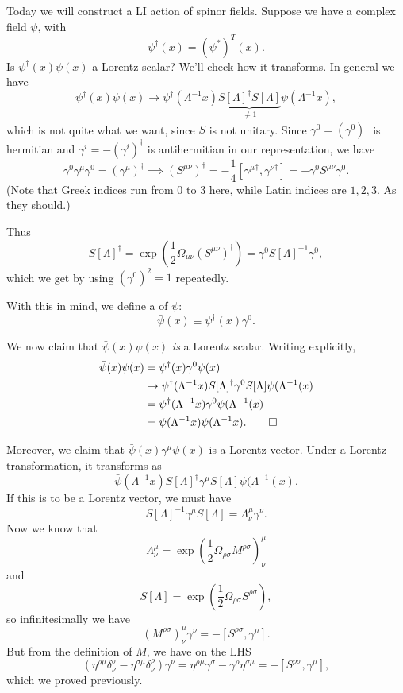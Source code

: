 Today we will construct a LI action of spinor fields. Suppose we have a complex field $\psi$, with
$$\psi^\dagger(x)=(\psi^*)^T(x).$$
Is $\psi^\dagger(x) \psi(x)$ a Lorentz scalar? We'll check how it transforms. In general we have
\begin{equation}
    \psi^\dagger(x)\psi(x) \to \psi^\dagger(\Lambda^{-1}x)\underbrace{S[\Lambda]^\dagger S[\Lambda]}_{\neq 1}\psi(\Lambda^{-1}x),
\end{equation}
which is not quite what we want, since $S$ is not unitary. Since $\gamma^0=(\gamma^0)^\dagger$ is hermitian and $\gamma^i=-(\gamma^i)^\dagger$ is antihermitian in our representation, we have
\begin{equation}
    \gamma^0 \gamma^\mu \gamma^0=(\gamma^\mu)^\dagger\implies (S^{\mu\nu})^\dagger =-\frac{1}{4}[{\gamma^\mu}^\dagger,{\gamma^\nu}^\dagger]=-\gamma^0 S^{\mu\nu}\gamma^0.
\end{equation}
(Note that Greek indices run from $0$ to $3$ here, while Latin indices are $1,2,3$. As they should.)

Thus
$$S[\Lambda]^\dagger=\exp(\frac{1}{2} \Omega_{\mu\nu}(S^{\mu\nu})^\dagger)=\gamma^0 S[\Lambda]^{-1}\gamma^0,$$
which we get by using $(\gamma^0)^2=1$ repeatedly. 
\begin{defn}
With this in mind, we define a  of $\psi$:
$$\bar\psi(x)\equiv \psi^\dagger(x) \gamma^0.$$
\end{defn}
We now claim that $\bar \psi(x)\psi(x)$ \emph{is} a Lorentz scalar. Writing explicitly,
\begin{align*}
    \bar \psi(x)\psi(x) &= \psi^\dagger(x) \gamma^0 \psi(x)\\
    &\to \psi^\dagger(\Lambda^{-1}x)S[\Lambda]^\dagger \gamma^0 S[\Lambda]\psi(\Lambda^{-1}(x)\\
    &=\psi^\dagger(\Lambda^{-1}x) \gamma^0 \psi(\Lambda^{-1}(x)\\
    &= \bar \psi(\Lambda^{-1}x)\psi(\Lambda^{-1}x). \qed
\end{align*}

Moreover, we claim that $\bar\psi(x)\gamma^\mu \psi(x)$ is a Lorentz vector. Under a Lorentz transformation, it transforms as
$$\bar\psi(\Lambda^{-1}x)S[\Lambda]^\dagger \gamma^\mu S[\Lambda]\psi(\Lambda^{-1}(x).$$
If this is to be a Lorentz vector, we must have
$$S[\Lambda]^{-1} \gamma^\mu S[\Lambda]=\Lambda^\mu_\nu \gamma^\nu.$$
Now we know that
$$\Lambda^\mu_\nu = \exp\left(\frac{1}{2}\Omega_{\rho\sigma}M^{\rho\sigma}\right)^\mu_\nu$$
and
$$S[\Lambda]=\exp\left(\frac{1}{2}\Omega_{\rho\sigma}S^{\rho\sigma}\right),$$
so infinitesimally we have
$$(M^{\rho\sigma})^\mu_\nu \gamma^\nu = -[S^{\rho\sigma},\gamma^\mu].$$ But from the definition of $M$, we have on the LHS
$$(\eta^{\rho\mu}\delta^\sigma_\nu-\eta^{\sigma\mu}\delta^\rho_\nu)\gamma^\nu =\eta^{\rho\mu}\gamma^\sigma - \gamma^\rho \eta^{\sigma\mu}=-[S^{\rho\sigma},\gamma^\mu],$$
which we proved previously.

